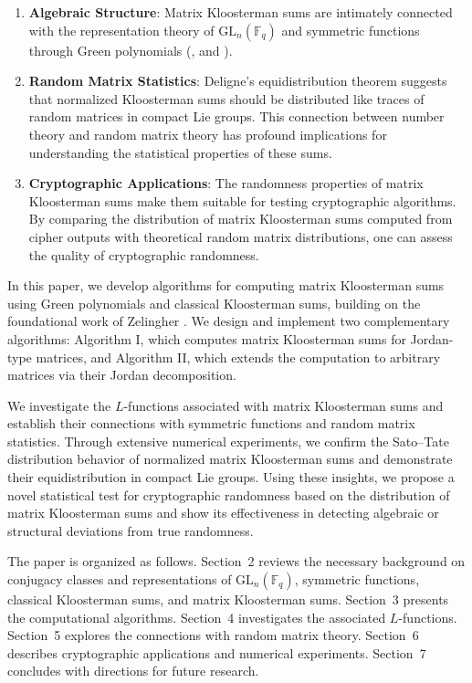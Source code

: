 \documentclass[11pt]{article}
\newcommand{\Fq}{\mathbb{F}_q}
\newcommand{\GL}{\mathrm{GL}}
\begin{document}
\begin{enumerate}
\item \textbf{Algebraic Structure}: Matrix Kloosterman sums are intimately connected with the representation theory of $\GL_n(\Fq)$ and symmetric functions through Green polynomials (\cite{green1955characters, macdonald1998Symmetric}, and \cite{zelingher2023matrix}).

\item \textbf{Random Matrix Statistics}: Deligne's equidistribution theorem \cite{Katz88} suggests that normalized Kloosterman sums should be distributed like traces of random matrices in compact Lie groups. This connection between number theory and random matrix theory has profound implications for understanding the statistical properties of these sums.

\item \textbf{Cryptographic Applications}: The randomness properties of matrix Kloosterman sums make them suitable for testing cryptographic algorithms. By comparing the distribution of matrix Kloosterman sums computed from cipher outputs with theoretical random matrix distributions, one can assess the quality of cryptographic randomness.
\end{enumerate}

In this paper, we develop algorithms for computing matrix Kloosterman sums using Green polynomials and classical Kloosterman sums, building on the foundational work of Zelingher \cite{zelingher2023matrix}. We design and implement two complementary algorithms: Algorithm I, which computes matrix Kloosterman sums for Jordan-type matrices, and Algorithm II, which extends the computation to arbitrary matrices via their Jordan decomposition.

We investigate the $L$-functions associated with matrix Kloosterman sums and establish their connections with symmetric functions and random matrix statistics. Through extensive numerical experiments, we confirm the Sato–Tate distribution behavior of normalized matrix Kloosterman sums and demonstrate their equidistribution in compact Lie groups. Using these insights, we propose a novel statistical test for cryptographic randomness based on the distribution of matrix Kloosterman sums and show its effectiveness in detecting algebraic or structural deviations from true randomness.

The paper is organized as follows. Section~2 reviews the necessary background on conjugacy classes and representations of $\GL_n(\Fq)$, symmetric functions, classical Kloosterman sums, and matrix Kloosterman sums. Section~3 presents the computational algorithms. Section~4 investigates the associated $L$-functions. Section~5 explores the connections with random matrix theory. Section~6 describes cryptographic applications and numerical experiments. Section~7 concludes with directions for future research.
\end{document}
